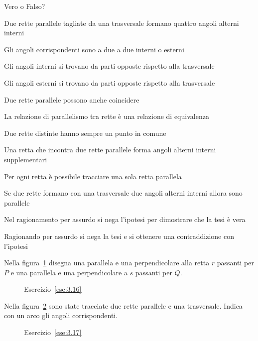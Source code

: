 \begin{esercizio}
\label{ese:3.15}
Vero o Falso?
\begin{enumeratea}
\item Due rette parallele tagliate da una trasversale formano quattro angoli alterni interni\tab\hfill\boxV\quad\boxF
\item Gli angoli corrispondenti sono a due a due interni o esterni\hfill\boxV\quad\boxF
\item Gli angoli interni si trovano da parti opposte rispetto alla trasversale\hfill\boxV\quad\boxF
\item Gli angoli esterni si trovano da parti opposte rispetto alla trasversale\hfill\boxV\quad\boxF
\item Due rette parallele possono anche coincidere\hfill\boxV\quad\boxF
\item La relazione di parallelismo tra rette è una relazione di equivalenza\hfill\boxV\quad\boxF
\item Due rette distinte hanno sempre un punto in comune\hfill\boxV\quad\boxF
\item Una retta che incontra due rette parallele forma angoli alterni interni supplementari\tab\hfill\boxV\quad\boxF
\item Per ogni retta è possibile tracciare una sola retta parallela\hfill\boxV\quad\boxF
\item Se due rette formano con una trasversale due angoli alterni interni allora sono parallele\tab\hfill\boxV\quad\boxF
\item Nel ragionamento per assurdo si nega l'ipotesi per dimostrare che la tesi è vera\tab\tab\hfill\boxV\quad\boxF
\item Ragionando per assurdo si nega la tesi e si ottenere una contraddizione con l'ipotesi\tab\hfill\boxV\quad\boxF
\end{enumeratea}
\end{esercizio}

\begin{esercizio}
\label{ese:3.16}
Nella figura~\ref{fig:ese3.16} disegna una parallela e una perpendicolare alla retta $r$ passanti per $P$ e una parallela e una perpendicolare a $s$ passanti per $Q$.
\end{esercizio}
\begin{figure}[htb]
\centering
\caption{Esercizio~\ref{ese:3.16}}\label{fig:ese3.16}
\end{figure}

\begin{esercizio}
\label{ese:3.17}
Nella figura~\ref{fig:ese3.17} sono state tracciate due rette parallele e una trasversale. Indica con un arco gli angoli corrispondenti.
\end{esercizio}
\begin{figure}[htb]
\centering
\caption{Esercizio~\ref{ese:3.17}}\label{fig:ese3.17}
\end{figure}

